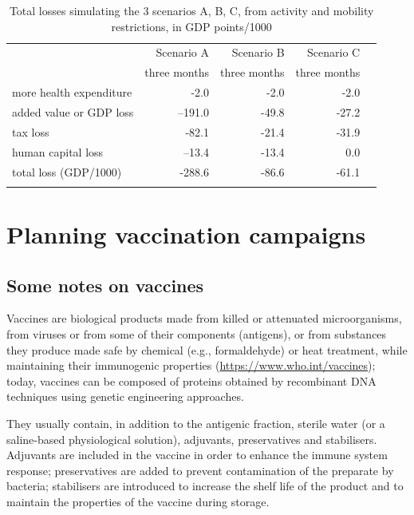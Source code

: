 \documentclass[graybox]{svmult}
\begin{document}
\begin{table}[t]
\centering
\begin{tabular}{lrrrr}
\hline\noalign{\smallskip}
& Scenario A & Scenario B & Scenario C \\
& three months & three months & three months \\
\noalign{\smallskip}\svhline\noalign{\smallskip}
more health expenditure & -2.0 & -2.0 & -2.0  \\
added value or GDP loss & --191.0 & -49.8 & -27.2 \\
tax loss & -82.1 & -21.4 & -31.9 \\
human capital loss &--13.4 & -13.4 & 0.0 \\
total loss (GDP/1000) & -288.6 & -86.6 & -61.1 \\
\hline\noalign{\smallskip}  
\end{tabular}
\caption{Total losses simulating the 3 scenarios A, B, C, from activity and mobility restrictions, in GDP points/1000}
\label{ABC2}
\end{table}





\section{Planning vaccination campaigns}
\label{planning}

\subsection{Some notes on vaccines}
\label{vaccineAction}

Vaccines are biological products made from killed or attenuated microorganisms, from viruses or from some of their components (antigens), or from substances they produce made safe by chemical (e.g., formaldehyde) or heat treatment, while maintaining their immunogenic properties (\href{https://www.who.int/vaccines}{https://www.who.int/vaccines}); today, vaccines can be composed of proteins obtained by recombinant DNA techniques using genetic engineering approaches.

They usually contain, in addition to the antigenic fraction, sterile water (or a saline-based physiological solution), adjuvants, preservatives and stabilisers. Adjuvants are included in the vaccine in order to enhance the immune system response; preservatives are added to prevent contamination of the preparate by bacteria; stabilisers are introduced to increase the shelf life of the product and to maintain the properties of the vaccine during storage.
\end{document}
